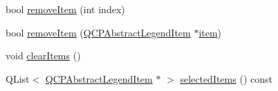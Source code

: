 \begin{DoxyCompactItemize}
\item 
bool \hyperlink{class_q_c_p_legend_ac91595c3eaa746fe6321d2eb952c63bb}{remove\+Item} (int index)
\item 
bool \hyperlink{class_q_c_p_legend_a2aea4ec6da2d454dd0b241a254d65082}{remove\+Item} (\hyperlink{class_q_c_p_abstract_legend_item}{Q\+C\+P\+Abstract\+Legend\+Item} $\ast$\hyperlink{class_q_c_p_legend_acfe9694c45104a3359d3806ed366fcf7}{item})
\item 
void \hyperlink{class_q_c_p_legend_a24795c7250eb5214fcea16b7217b4dfb}{clear\+Items} ()
\item 
Q\+List$<$ \hyperlink{class_q_c_p_abstract_legend_item}{Q\+C\+P\+Abstract\+Legend\+Item} $\ast$ $>$ \hyperlink{class_q_c_p_legend_ac7d9e567d5c551e09cd9bcc4306c5532}{selected\+Items} () const
\end{DoxyCompactItemize}

